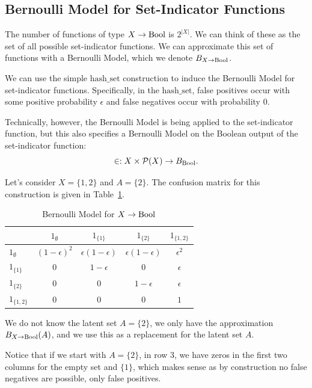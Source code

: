 \documentclass[../main.tex]{subfiles}
\begin{document}
\subsection{Bernoulli Model for Set-Indicator Functions}

The number of functions of type $X \to \mathrm{Bool}$ is $2^{|X|}$. We can think of these as the set of all possible set-indicator functions. We can approximate this set of functions with a Bernoulli Model, which we denote $B_{X \to \mathrm{Bool}}$.

We can use the simple $\mathrm{hash\_set}$ construction to induce the Bernoulli Model for set-indicator functions. Specifically, in the $\mathrm{hash\_set}$, false positives occur with some positive probability $\epsilon$ and false negatives occur with probability $0$.

Technically, however, the Bernoulli Model is being applied to the set-indicator function, but this also specifies a Bernoulli Model on the Boolean output of the set-indicator function:
\begin{equation}
    \in : X \times \mathcal{P}(X) \to B_{\mathrm{Bool}}.
\end{equation}

Let's consider $X = \{1,2\}$ and $A = \{2\}$. The confusion matrix for this construction is given in Table~\ref{tbl:set_indicator}.

\begin{table}[htbp]
\centering
\caption{Bernoulli Model for $X \to \mathrm{Bool}$}
\label{tbl:set_indicator}
\begin{tabular}{@{}lcccc@{}}
\toprule
& $1_\emptyset$ & $1_{\{1\}}$ & $1_{\{2\}}$ & $1_{\{1,2\}}$ \\
\midrule
$1_\emptyset$ & $(1-\epsilon)^2$ & $\epsilon(1-\epsilon)$ & $\epsilon(1-\epsilon)$ & $\epsilon^2$ \\
$1_{\{1\}}$ & $0$ & $1-\epsilon$ & $0$ & $\epsilon$ \\
$1_{\{2\}}$ & $0$ & $0$ & $1-\epsilon$ & $\epsilon$ \\
$1_{\{1,2\}}$ & $0$ & $0$ & $0$ & $1$ \\
\bottomrule
\end{tabular}
\end{table}

We do not know the latent set $A = \{2\}$, we only have the approximation
$B_{X \to \mathrm{Bool}}(A)$, and we use this as a replacement for the latent set $A$.

Notice that if we start with $A = \{2\}$, in row 3, we have zeros in the first two columns for the empty set and $\{1\}$, which makes sense as by construction no false negatives are possible, only false positives.
\end{document}
